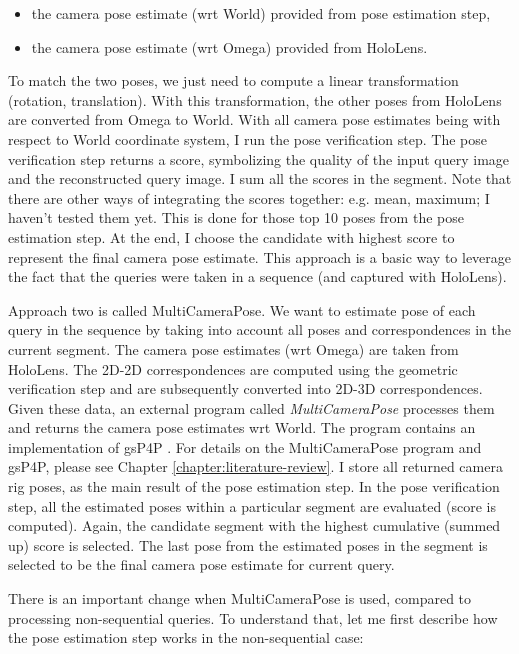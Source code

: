 \documentclass[twoside]{ctuthesis}
\theoremstyle{plain}
\theoremstyle{definition}
\theoremstyle{note}
\newcommand{\topPE}{10} %
\begin{document}
\begin{itemize}
	\item the camera pose estimate (wrt World) provided from pose estimation step,
	\item the camera pose estimate (wrt Omega) provided from HoloLens.
\end{itemize}

To match the two poses, we just need to compute a linear transformation (rotation, translation). With this transformation, the other poses from HoloLens are converted from Omega to World. With all camera pose estimates being with respect to World coordinate system, I run the pose verification step. The pose verification step returns a score, symbolizing the quality of the input query image and the reconstructed query image. I sum all the scores in the segment. Note that there are other ways of integrating the scores together: e.g. mean, maximum; I haven't tested them yet. This is done for those top \topPE{} poses from the pose estimation step. At the end, I choose the candidate with highest score to represent the final camera pose estimate. This approach is a basic way to leverage the fact that the queries were taken in a sequence (and captured with HoloLens).

Approach two is called MultiCameraPose. We want to estimate pose of each query in the sequence by taking into account all poses and correspondences in the current segment. The camera pose estimates (wrt Omega) are taken from HoloLens. The 2D-2D correspondences are computed using the geometric verification step and are subsequently converted into 2D-3D correspondences. Given these data, an external program called \emph{MultiCameraPose} \cite{MultiCameraPose} processes them and returns the camera pose estimates wrt World. The program contains an implementation of gsP4P \cite{Kukelova2016CVPR}. For details on the MultiCameraPose program and gsP4P, please see Chapter \ref{chapter:literature-review}. I store all returned camera rig poses, as the main result of the pose estimation step. In the pose verification step, all the estimated poses within a particular segment are evaluated (score is computed). Again, the candidate segment with the highest cumulative (summed up) score is selected. The last pose from the estimated poses in the segment is selected to be the final camera pose estimate for current query.

There is an important change when MultiCameraPose is used, compared to processing non-sequential queries. To understand that, let me first describe how the pose estimation step works in the non-sequential case:
\end{document}
